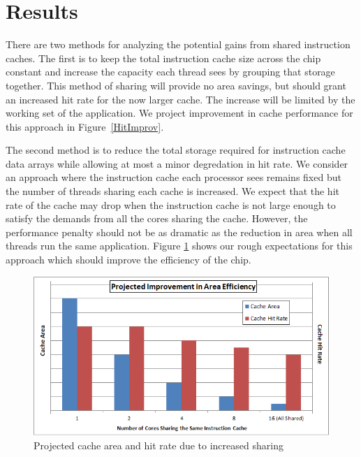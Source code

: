\section{Results}

There are two methods for analyzing the potential gains from shared
instruction caches.
The first is to keep the total instruction cache size across the chip
constant and increase the capacity each thread sees by grouping that
storage together.
This method of sharing will provide no area savings, but should grant
an increased hit rate for the now larger cache.
The increase will be limited by the working set of the application.
We project improvement in cache performance for this approach in
Figure~\ref{HitImprov}. 


The second method is to reduce the total storage required for
instruction cache data arrays while allowing at most a minor
degredation in hit rate.
We consider an approach where the instruction cache each processor
sees remains fixed but the number of threads sharing each cache is
increased. 
We expect that the hit rate of the cache may drop when the instruction
cache is not large enough to satisfy the demands from all the cores
sharing the cache.
However, the performance penalty should not be as dramatic as the
reduction in area when all threads run the same application.
Figure \ref{AreaEff} shows our rough expectations for this approach
which should improve the efficiency of the chip.

\begin{figure}
\centering
\includegraphics[width=\columnwidth]{graphics/AreaEff.png}
\caption{Projected cache area and hit rate due to increased sharing}
\label{AreaEff}
\end{figure}


